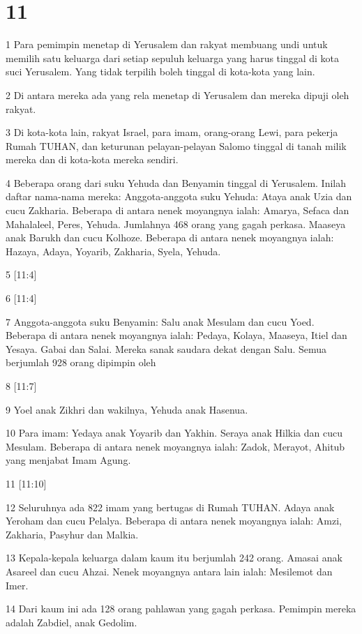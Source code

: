 \chapter{11}

\par 1 Para pemimpin menetap di Yerusalem dan rakyat membuang undi untuk memilih satu keluarga dari setiap sepuluh keluarga yang harus tinggal di kota suci Yerusalem. Yang tidak terpilih boleh tinggal di kota-kota yang lain.
\par 2 Di antara mereka ada yang rela menetap di Yerusalem dan mereka dipuji oleh rakyat.
\par 3 Di kota-kota lain, rakyat Israel, para imam, orang-orang Lewi, para pekerja Rumah TUHAN, dan keturunan pelayan-pelayan Salomo tinggal di tanah milik mereka dan di kota-kota mereka sendiri.
\par 4 Beberapa orang dari suku Yehuda dan Benyamin tinggal di Yerusalem. Inilah daftar nama-nama mereka: Anggota-anggota suku Yehuda: Ataya anak Uzia dan cucu Zakharia. Beberapa di antara nenek moyangnya ialah: Amarya, Sefaca dan Mahalaleel, Peres, Yehuda. Jumlahnya 468 orang yang gagah perkasa. Maaseya anak Barukh dan cucu Kolhoze. Beberapa di antara nenek moyangnya ialah: Hazaya, Adaya, Yoyarib, Zakharia, Syela, Yehuda.
\par 5 [11:4]
\par 6 [11:4]
\par 7 Anggota-anggota suku Benyamin: Salu anak Mesulam dan cucu Yoed. Beberapa di antara nenek moyangnya ialah: Pedaya, Kolaya, Maaseya, Itiel dan Yesaya. Gabai dan Salai. Mereka sanak saudara dekat dengan Salu. Semua berjumlah 928 orang dipimpin oleh
\par 8 [11:7]
\par 9 Yoel anak Zikhri dan wakilnya, Yehuda anak Hasenua.
\par 10 Para imam: Yedaya anak Yoyarib dan Yakhin. Seraya anak Hilkia dan cucu Mesulam. Beberapa di antara nenek moyangnya ialah: Zadok, Merayot, Ahitub yang menjabat Imam Agung.
\par 11 [11:10]
\par 12 Seluruhnya ada 822 imam yang bertugas di Rumah TUHAN. Adaya anak Yeroham dan cucu Pelalya. Beberapa di antara nenek moyangnya ialah: Amzi, Zakharia, Pasyhur dan Malkia.
\par 13 Kepala-kepala keluarga dalam kaum itu berjumlah 242 orang. Amasai anak Asareel dan cucu Ahzai. Nenek moyangnya antara lain ialah: Mesilemot dan Imer.
\par 14 Dari kaum ini ada 128 orang pahlawan yang gagah perkasa. Pemimpin mereka adalah Zabdiel, anak Gedolim.
